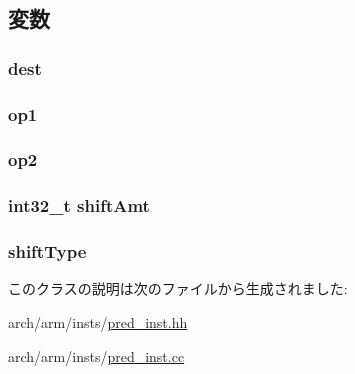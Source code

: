 \subsection{変数}
\hypertarget{classArmISA_1_1DataRegOp_aec72e8e45bdc87abeeeb75d2a8a9a716}{
\subsubsection[{dest}]{ {\bf dest}}}
\label{classArmISA_1_1DataRegOp_aec72e8e45bdc87abeeeb75d2a8a9a716}
\hypertarget{classArmISA_1_1DataRegOp_a4c465c43ad568f8bcf8ae71480e9cfea}{
\subsubsection[{op1}]{ {\bf op1}}}
\label{classArmISA_1_1DataRegOp_a4c465c43ad568f8bcf8ae71480e9cfea}
\hypertarget{classArmISA_1_1DataRegOp_a7799ff6cbe5a252199059eb8665820e7}{
\subsubsection[{op2}]{ {\bf op2}}}
\label{classArmISA_1_1DataRegOp_a7799ff6cbe5a252199059eb8665820e7}
\hypertarget{classArmISA_1_1DataRegOp_a378dfadeb317c390962c147be928d92d}{
\subsubsection[{shiftAmt}]{\setlength{\rightskip}{0pt plus 5cm}int32\_\-t {\bf shiftAmt}}}
\label{classArmISA_1_1DataRegOp_a378dfadeb317c390962c147be928d92d}
\hypertarget{classArmISA_1_1DataRegOp_ae5b7df4bd366c5419743bf5f679485b9}{
\subsubsection[{shiftType}]{ {\bf shiftType}}}
\label{classArmISA_1_1DataRegOp_ae5b7df4bd366c5419743bf5f679485b9}


このクラスの説明は次のファイルから生成されました:\begin{DoxyCompactItemize}
\item 
arch/arm/insts/\hyperlink{pred__inst_8hh}{pred\_\-inst.hh}\item 
arch/arm/insts/\hyperlink{pred__inst_8cc}{pred\_\-inst.cc}\end{DoxyCompactItemize}
